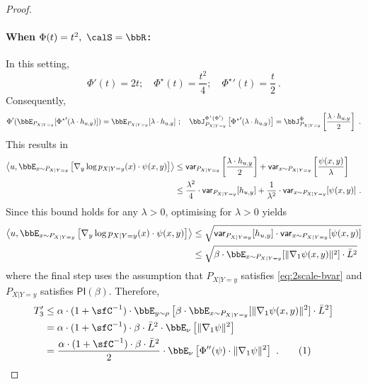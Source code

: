\documentclass[11pt]{article}
\newcommand{\numberthis}{\addtocounter{equation}{1}\tag{\theequation}}
\newcommand{\PI}[1]{\mathsf{PI}\left(#1\right)}
\newcommand{\Phient}[3]{
    \ensuremath{\if$#3$\bbJ_{#1}^{#2}\else\bbJ_{#1}^{#2}\left[#3\right]\fi}}
\newcommand{\var}{\mathsf{var}}
\begin{document}
\begin{proof}
\paragraph{When \(\Phi(t) = t^{2},~\calS = \bbR\): }
In this setting,
\begin{equation*}
    \Phi'(t) = 2t; \quad \Phi^{\star}(t) = \frac{t^{2}}{4}; \quad {\Phi^{\star}}'(t) = \frac{t}{2}~.
\end{equation*}
Consequently,
\begin{equation*}
    \Phi'(\bbE_{P_{X | Y = y}}[{\Phi^{\star}}'(\lambda \cdot h_{u, y})]) = \bbE_{P_{X | Y = y}}[\lambda \cdot h_{u, y}]~; \quad \Phient{P_{X | Y = y}}{\Phi^{\star}(\Phi')}{{\Phi^{\star}}'(\lambda \cdot h_{u, y})} = \Phient{P_{X | Y = y}}{\Phi}{\frac{\lambda \cdot h_{u, y}}{2}}~.
\end{equation*}
This results in
\begin{align*}
    \left\langle u, \bbE_{x \sim P_{X | Y = y}}\left[\nabla_{y}\log p_{X | Y = y}(x) \cdot \psi(x, y) \right]\right\rangle &\leq \var{}_{P_{X | Y = y}}\left[\frac{\lambda \cdot h_{u, y}}{2}\right] + \var{}_{x \sim P_{X | Y = y}}\left[\frac{\psi(x, y)}{\lambda}\right] \\
    &\leq \frac{\lambda^{2}}{4} \cdot \var{}_{P_{X | Y = y}}[h_{u, y}] + \frac{1}{\lambda^{2}} \cdot \var{}_{x \sim P_{X | Y = y}}[\psi(x, y)]~.
\end{align*}
Since this bound holds for any \(\lambda > 0\), optimising for \(\lambda > 0\) yields
\begin{align*}
    \left\langle u, \bbE_{x \sim P_{X | Y = y}}\left[\nabla_{y}\log p_{X | Y = y}(x) \cdot \psi(x, y) \right]\right\rangle &\leq \sqrt{\var{}_{P_{X | Y = y}}[h_{u, y}] \cdot \var{}_{x \sim P_{X | Y =y}}[\psi(x, y)]} \\
    &\leq \sqrt{\beta \cdot \bbE_{x \sim P_{X | Y = y}}[\|\nabla_{1}\psi(x, y)\|^{2}] \cdot \bar{L}^{2}}~
\end{align*}
where the final step uses the assumption that \(P_{X | Y = y}\) satisfies \ref{eq:2scale-bvar} and \(P_{X | Y = y}\) satisfies \(\PI{\beta}\).
Therefore,
\begin{align*}
    T_{3}' &\leq \alpha \cdot (1 + \sfC^{-1}) \cdot \bbE_{y \sim \rho}\left[\beta \cdot \bbE_{x \sim P_{X | Y =y}}[\|\nabla_{1}\psi(x, y)\|^{2}] \cdot \bar{L}^{2}\right] \\
    &= \alpha \cdot (1 + \sfC^{-1}) \cdot \beta \cdot \bar{L}^{2} \cdot \bbE_{\nu}\left[\|\nabla_{1}\psi\|^{2}\right] \\
    &= \frac{\alpha \cdot (1 + \sfC^{-1}) \cdot \beta \cdot \bar{L}^{2}}{2} \cdot \bbE_{\nu}\left[\Phi''(\psi) \cdot \|\nabla_{1}\psi\|^{2}\right]~.\numberthis\label{eq:T3dash-bound-pi}
\end{align*}


\end{proof}
\end{document}
